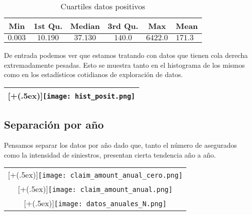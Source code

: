\documentclass[DIV=calc, 
					paper=letter, 
					fontsize=11pt, 
					twocolumn]{scrartcl}
\newcommand*{\addheight}[2][.5ex]{%
  \raisebox{0pt}[\dimexpr\height+(#1)\relax]{#2}%
}
\begin{document}
\begin{table}[h*]
\caption{Cuartiles datos positivos}
\centering
\resizebox{0.4\textwidth}{!}
{
\begin{tabular}{ccccc|l}
\toprule
Min & 1st Qu. & Median & 3rd Qu. & Max & Mean\\
\midrule
$0.003$ & $10.190$ &$37.130$ &$140.0$ &$6422.0$ & $171.3$ \\
\bottomrule
\end{tabular}}
\end{table}
\noindent De entrada podemos ver que estamos tratando con datos que tienen cola derecha extremadamente pesadas. Esto se muestra tanto en el histograma de los mismos como en los estad\'isticos cotidianos de exploraci\'on de datos.
\begin{tabular}{|c|}
      \hline
      \addheight{\texttt{[image: hist\_posit.png]}} \\
      \hline
\end{tabular}



\subsection{Separaci\'on por a\~{n}o}

\indent Pensamos separar los datos por a\~{n}o dado que, tanto el n\'umero de asegurados como la intensidad de siniestros, presentan cierta tendencia a\~{n}o a a\~{n}o.\\
\begin{tabular}{|c|}
      \hline
      \addheight{\texttt{[image: claim\_amount\_anual\_cero.png]}} \\
      \addheight{\texttt{[image: claim\_amount\_anual.png]}} \\
      \addheight{\texttt{[image: datos\_anuales\_N.png]}} \\
      \hline
\end{tabular}
\end{document}
